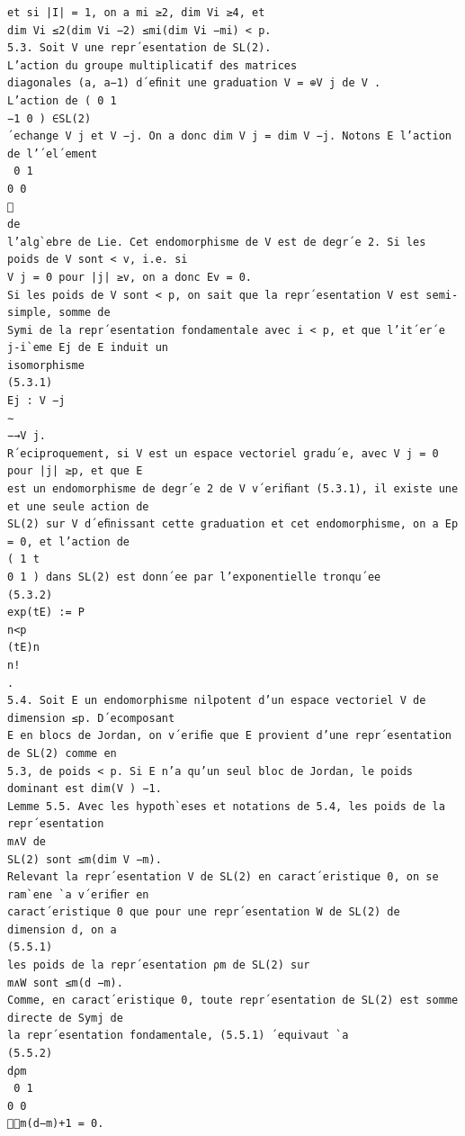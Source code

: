 \documentclass[10pt]{article}
\begin{document}
\begin{verbatim}
et si |I| = 1, on a mi ≥2, dim Vi ≥4, et
dim Vi ≤2(dim Vi −2) ≤mi(dim Vi −mi) < p.
5.3. Soit V une repr´esentation de SL(2).
L’action du groupe multiplicatif des matrices
diagonales (a, a−1) d´eﬁnit une graduation V = ⊕V j de V .
L’action de ( 0 1
−1 0 ) ∈SL(2)
´echange V j et V −j. On a donc dim V j = dim V −j. Notons E l’action de l’´el´ement
  0 1
0 0

de
l’alg`ebre de Lie. Cet endomorphisme de V est de degr´e 2. Si les poids de V sont < v, i.e. si
V j = 0 pour |j| ≥v, on a donc Ev = 0.
Si les poids de V sont < p, on sait que la repr´esentation V est semi-simple, somme de
Symi de la repr´esentation fondamentale avec i < p, et que l’it´er´e j-i`eme Ej de E induit un
isomorphisme
(5.3.1)
Ej : V −j
∼
−→V j.
R´eciproquement, si V est un espace vectoriel gradu´e, avec V j = 0 pour |j| ≥p, et que E
est un endomorphisme de degr´e 2 de V v´eriﬁant (5.3.1), il existe une et une seule action de
SL(2) sur V d´eﬁnissant cette graduation et cet endomorphisme, on a Ep = 0, et l’action de
( 1 t
0 1 ) dans SL(2) est donn´ee par l’exponentielle tronqu´ee
(5.3.2)
exp(tE) := P
n<p
(tE)n
n!
.
5.4. Soit E un endomorphisme nilpotent d’un espace vectoriel V de dimension ≤p. D´ecomposant
E en blocs de Jordan, on v´eriﬁe que E provient d’une repr´esentation de SL(2) comme en
5.3, de poids < p. Si E n’a qu’un seul bloc de Jordan, le poids dominant est dim(V ) −1.
Lemme 5.5. Avec les hypoth`eses et notations de 5.4, les poids de la repr´esentation
m∧V de
SL(2) sont ≤m(dim V −m).
Relevant la repr´esentation V de SL(2) en caract´eristique 0, on se ram`ene `a v´eriﬁer en
caract´eristique 0 que pour une repr´esentation W de SL(2) de dimension d, on a
(5.5.1)
les poids de la repr´esentation ρm de SL(2) sur
m∧W sont ≤m(d −m).
Comme, en caract´eristique 0, toute repr´esentation de SL(2) est somme directe de Symj de
la repr´esentation fondamentale, (5.5.1) ´equivaut `a
(5.5.2)
 dρm
  0 1
0 0
m(d−m)+1 = 0.


\end{verbatim}
\end{document}
